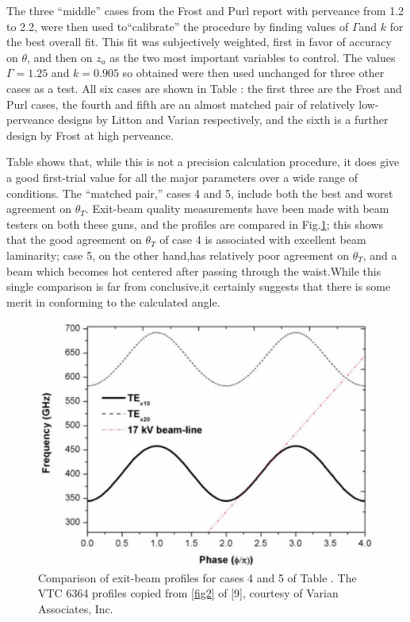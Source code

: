 \documentclass[10pt,a4paper,UTF8,fleqn]{article}
\begin{document}
The three ``middle'' cases from the Frost and Purl report with perveance from 1.2 to 2.2, were then used to``calibrate'' the procedure by finding values of $ \Gamma $and $ k $ for the best overall fit. This fit was subjectively weighted, first in favor of accuracy on $ \theta $, and then on $ z_a $ as the two most important variables to control. The values $ \Gamma = 1.25 $ and $ k=0.905 $ so obtained were then used unchanged for three other cases as a test. All six cases are shown in Table \uppercase\expandafter{}: the first three are the Frost and Purl cases, the fourth and fifth are an almost matched pair of relatively low-perveance designs by Litton and Varian respectively, and the sixth is a further design by Frost at high perveance.
 
Table \uppercase\expandafter{} shows that, while this is not a precision calculation procedure, it does give a good first-trial value for all the major parameters over a wide range of conditions. The ``matched pair,'' cases 4 and 5, include both the best and worst agreement on $ \theta_T $. Exit-beam quality measurements have been made with beam testers on both these guns, and the profiles are compared in Fig.\ref{fig3}; this shows that the good agreement on $ \theta_T $ of case 4 is associated with excellent beam laminarity; case 5, on the other hand,has relatively poor agreement on $ \theta_T $, and a beam which becomes hot centered after passing through the waist.While this single comparison is far from conclusive,it certainly suggests that there is some merit in conforming to the calculated angle.

\begin{figure}[phtb]
	\centering
	\includegraphics[width=0.6\linewidth]{figure/fig3}
		\caption{\small Comparison of exit-beam profiles for cases 4 and 5 of Table \uppercase\expandafter{}. The VTC 6364 profiles copied from \ref{fig2} of [9], courtesy of Varian Associates, Inc.}
	\label{fig3}
\end{figure}
\end{document}
